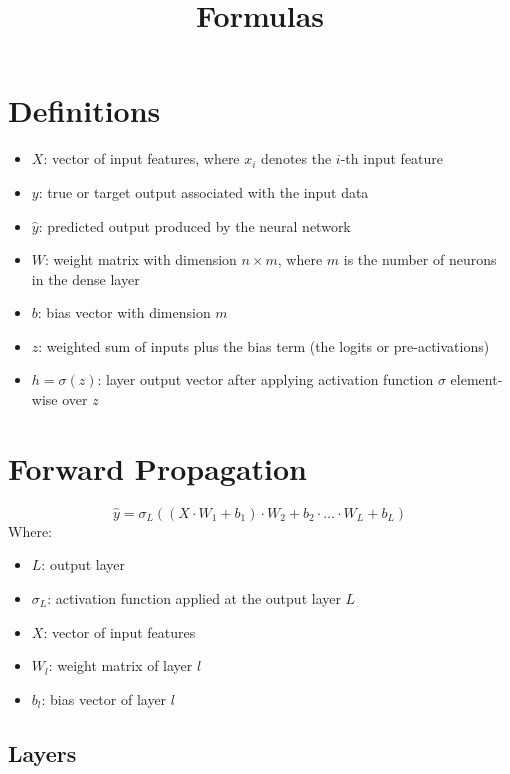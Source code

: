 \documentclass[a4paper]{article}
\title{\vspace{-1in}Formulas}
\author{}
\date{}
\newcommand{\haty}{\hat{y}}
\begin{document}
\maketitle
\vspace{-0.5in}

\section*{Definitions}

\begin{itemize}
\item $X$: vector of input features, where $x_i$ denotes the $i$-th input feature
\item $y$: true or target output associated with the input data
\item $\hat{y}$: predicted output produced by the neural network
\item $W$: weight matrix with dimension $n \times m$, where $m$ is the number of neurons in the dense layer
\item $b$: bias vector with dimension $m$
\item $z$: weighted sum of inputs plus the bias term (the logits or pre-activations)
\item $h=\sigma(z)$: layer output vector after applying activation function $\sigma$ element-wise over $z$
\end{itemize}

\section*{Forward Propagation}

\begin{equation*}
    \haty = \sigma_L((X \cdot W_1+b_1) \cdot W_2 + b_2 \cdot \ldots \cdot W_L + b_L)
\end{equation*}
Where:
\begin{itemize}
    \item $L$: output layer
    \item $\sigma_L$: activation function applied at the output layer $L$
    \item $X$: vector of input features
    \item $W_l$: weight matrix of layer $l$
    \item $b_l$: bias vector of layer $l$
\end{itemize}

\subsection*{Layers}
\end{document}
